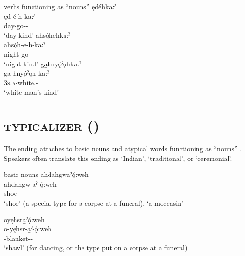 \newpage
\ea\label{ex:kaex2} verbs functioning as “nouns” 
\ea ędéhka:ˀ\\
\gll ęd-é-h-ka:ˀ\\
 day-go-{\noaspect-\customary}\\
\glt `day kind'
\ex ahsǫ́hehka:ˀ\\
\gll ahsǫ́h-e-h-ka:ˀ\\
 night-go-\exsc{\noaspect-\customary}\\
\glt `night kind'
\ex ga̱hnyǫ́ˀǫhka:ˀ \\
\gll ga̱-hnyǫ́ˀǫh-ka:ˀ\\
\textsc{3s.a}-white.{\stative}-\exsc{\customary}\\
\glt ‘white man’s kind’ 
\z
\z

\section{ \textsc{typicalizer} \textup{(}{\typicalizer}\textup{)}} \label{-ǫ:weh}
The  \textsc{\typicalizer} ending attaches to basic nouns  and atypical words functioning as “nouns” . Speakers often translate this ending as ‘Indian’, ‘traditional’, or ‘ceremonial’.

\ea\label{ex:oweh} basic nouns
\ea ahdahgwa̱ˀǫ́:weh \\
\gll ahdahgw-a̱ˀ-ǫ́:weh\\
 shoe-{\nsf}-{\typicalizer}\\
\glt ‘shoe’ (a special type for a corpse at a funeral), `a moccasin'

\newpage
{}

\ex oyęhsra̱ˀǫ́:weh \\
\gll o-yęhsr-a̱ˀ-ǫ́:weh\\
-blanket-{\nsf}-{\typicalizer}\\
\glt ‘shawl’ (for dancing, or the type put on a corpse at a funeral)


